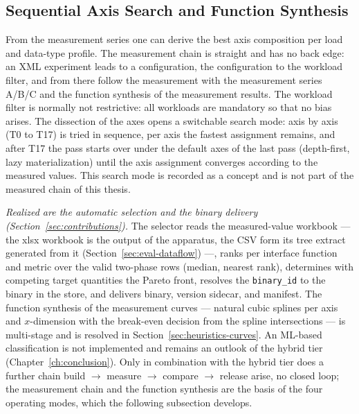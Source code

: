 \begin{nurkurz}
\subsection{Sequential Axis Search and Function Synthesis}\label{sec:heuristics-loop}
From the measurement series one can derive the best axis composition per load and
data-type profile.
The measurement chain is straight and has no back edge: an XML experiment leads to a configuration, the
configuration to the workload filter, and from there follow the measurement with the measurement series A/B/C
and the function synthesis of the measurement results. The workload filter is normally not restrictive: all
workloads are mandatory so that no bias arises. The dissection of the axes opens a switchable search mode:
axis by axis (T0 to T17) is tried in sequence, per axis the fastest assignment remains, and after T17 the pass
starts over under the default axes of the last pass (depth-first, lazy materialization) until the axis
assignment converges according to the measured values. This search mode is recorded as a concept
and is not part of the measured chain of this thesis.

\emph{Realized are the automatic selection and the binary delivery (Section~\ref{sec:contributions}).}
The selector reads the measured-value workbook --- the
xlsx workbook is the output of the apparatus, the CSV form its tree extract generated from it
(Section~\ref{sec:eval-dataflow}) ---, ranks per interface function and metric over the valid
two-phase rows (median, nearest rank), determines with competing target quantities the Pareto front,
resolves the \texttt{binary\_id} to the binary in the store, and delivers binary, version sidecar, and
manifest.
The function synthesis of the measurement curves --- natural cubic splines per axis and $x$-dimension with
the break-even decision from the spline intersections --- is multi-stage and is resolved in
Section~\ref{sec:heuristics-curves}. An ML-based classification is not implemented and remains an outlook of
the hybrid tier (Chapter~\ref{ch:conclusion}). Only in combination with the hybrid tier does a further chain
build $\to$ measure $\to$ compare $\to$ release arise, no closed loop; the measurement chain and the function
synthesis are the basis of the four operating modes, which the following subsection develops.
\end{nurkurz}

